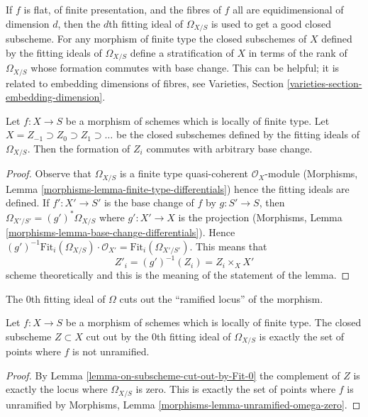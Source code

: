 \medskip\noindent
If $f$ is flat, of finite presentation, and the fibres of $f$
all are equidimensional of dimension $d$, then the $d$th fitting ideal
of $\Omega_{X/S}$ is used to get a good closed subscheme. For any
morphism of finite type the closed subschemes of $X$ defined by the
fitting ideals of $\Omega_{X/S}$ define a stratification of $X$
in terms of the rank of $\Omega_{X/S}$  whose formation commutes with
base change. This can be helpful; it is related to embedding dimensions of
fibres, see Varieties, Section \ref{varieties-section-embedding-dimension}.

\begin{lemma}
\label{lemma-base-change-and-fitting-ideal-omega}
Let $f : X \to S$ be a morphism of schemes which is locally of finite type.
Let $X = Z_{-1} \supset Z_0 \supset Z_1 \supset \ldots$
be the closed subschemes defined by the fitting ideals
of $\Omega_{X/S}$. Then the formation of $Z_i$ commutes
with arbitrary base change.
\end{lemma}

\begin{proof}
Observe that $\Omega_{X/S}$ is a finite type quasi-coherent
$\mathcal{O}_X$-module
(Morphisms, Lemma \ref{morphisms-lemma-finite-type-differentials})
hence the fitting ideals are defined. If $f' : X' \to S'$
is the base change of $f$ by $g : S' \to S$, then
$\Omega_{X'/S'} = (g')^*\Omega_{X/S}$ where $g' : X' \to X$
is the projection
(Morphisms, Lemma \ref{morphisms-lemma-base-change-differentials}).
Hence $(g')^{-1}\text{Fit}_i(\Omega_{X/S}) \cdot \mathcal{O}_{X'} =
\text{Fit}_i(\Omega_{X'/S'})$. This means that
$$
Z'_i = (g')^{-1}(Z_i) = Z_i \times_X X'
$$
scheme theoretically and this is the meaning of the statement of
the lemma.
\end{proof}

\noindent
The $0$th fitting ideal of $\Omega$
cuts out the ``ramified locus'' of the morphism.

\begin{lemma}
\label{lemma-zero-fitting-ideal-omega-unramified}
Let $f : X \to S$ be a morphism of schemes which is locally of finite type.
The closed subscheme $Z \subset X$ cut out by the $0$th fitting ideal of
$\Omega_{X/S}$ is exactly the set of points where $f$ is not unramified.
\end{lemma}

\begin{proof}
By Lemma \ref{lemma-on-subscheme-cut-out-by-Fit-0} the complement of $Z$
is exactly the locus where $\Omega_{X/S}$ is zero. This is exactly
the set of points where $f$ is unramified by
Morphisms, Lemma \ref{morphisms-lemma-unramified-omega-zero}.
\end{proof}

